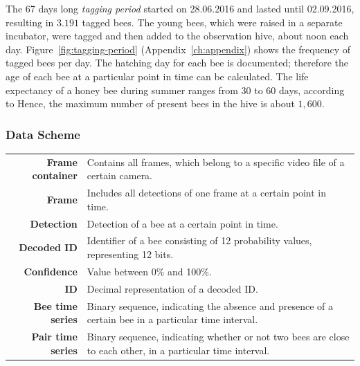 The 67 days long \emph{tagging period} started on 28.06.2016 and lasted until 02.09.2016, resulting in $3.191$ tagged bees. The young bees, which were raised in a separate incubator, were tagged and then added to the observation hive, about noon each day.
Figure~\ref{fig:tagging-period} (Appendix~\ref{ch:appendix}) shows the frequency of tagged bees per day. The hatching day for each bee is documented; therefore the age of each bee at a particular point in time can be calculated.
The life expectancy of a honey bee during summer ranges from 30 to 60 days, according to \textcite[p. 27]{menzel2016intelligenz}
Hence, the maximum number of present bees in the hive is about $1,600$.

\subsubsection{Data Scheme}
\label{subsec:datascheme}

\begin{table}[!t]
\small
\colorbox{usethiscolorhere}{
\centering
\begin{tabularx}{\textwidth}{@{} r Y @{}}
	\textbf{Frame container} &
	Contains all frames, which belong to a specific video file of a certain camera.\\
	\textbf{Frame} &
	Includes all detections of one frame at a certain point in time.\\
	\textbf{Detection} &
	Detection of a bee at a certain point in time.\\
	\textbf{Decoded ID} &
	Identifier of a bee consisting of 12 probability values, representing 12 bits.\\
	\textbf{Confidence} &
	Value between 0\% and 100\%.\\
	\textbf{ID} &
	Decimal representation of a decoded ID.\\
	\textbf{Bee time series} & Binary sequence, indicating the absence and presence of a certain bee in a particular time interval.\\
	\textbf{Pair time series} & Binary sequence, indicating whether or not two bees are close to each other, in a particular time interval.\\
\end{tabularx}
}
\end{table}

